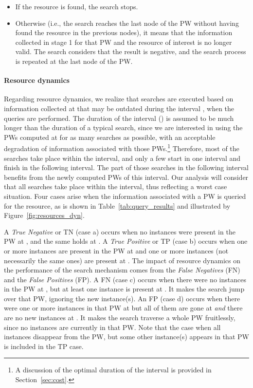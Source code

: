 \documentclass[]{elsarticle}
\begin{document}
\begin{enumerate}
\begin{itemize}
\begin{itemize}
\item
If the resource is found, the search stops. 

\item
Otherwise (i.e., the search reaches the last node of the PW without having found the resource in the previous nodes), it means that the information collected in stage 1 for that PW and the resource of interest is no longer valid. The search considers that the result is negative, and the search process is repeated at the last node of the PW.

\end{itemize}

\end{itemize}

\end{enumerate}

\paragraph{Resource dynamics} Regarding resource dynamics, we realize that searches are executed based on information collected at  that may be outdated during the interval , when the queries are performed. 
The duration of the interval () is assumed to be much longer than the duration of a typical search, since we are interested in using the PWs computed at  for as many searches as possible, with an acceptable degradation of information associated with those PWs.\footnote{A discussion of the optimal duration of the interval is provided in Section~\ref{sec:cost}.} Therefore, most of the searches take place within the interval, and only a few start in one interval and finish in the following interval. The part of those searches in the following interval benefits from the newly computed PWs of this interval. Our analysis will consider that all searches take place within the interval, thus reflecting a worst case situation.  
Four cases arise when the information associated with a PW is queried for the resource, as is shown in Table~\ref{tab:query_results} and illustrated by Figure~\ref{fig:resources_dyn}. 

A \emph{True Negative} or TN (case a) occurs when no instances were present in the PW at , and the same holds at \mbox{}. A \emph{True Positive} or TP (case b) occurs when one or more instances are present in the PW at  and one or more instances (not necessarily the same ones) are present at . The impact of resource dynamics on the performance of the search mechanism comes from the \emph{False Negatives} (FN) and the \emph{False Positives} (FP). A FN (case c) occurs when there were no instances in the PW at , but at least one instance is present at . It makes the search jump over that PW, ignoring the new instance(s). An FP (case d) occurs when there were one or more instances in that PW at  but all of them are gone at  \emph{and} there are no new instances at . It makes the search traverse a whole PW fruitlessly, since no instances are currently in that PW. Note that the case when all instances disappear from the PW, but some other instance(s) appears in that PW is included in the TP case.
\end{document}
